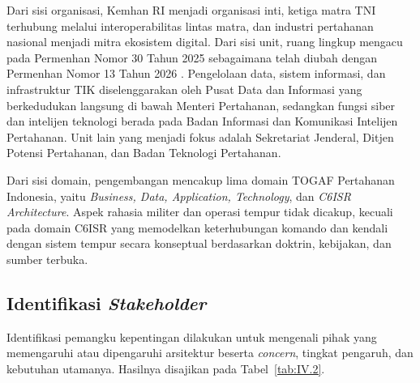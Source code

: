 Dari sisi organisasi, Kemhan RI menjadi organisasi inti, ketiga matra TNI terhubung melalui interoperabilitas lintas matra, dan industri pertahanan nasional menjadi mitra ekosistem digital. Dari sisi unit, ruang lingkup mengacu pada Permenhan Nomor 30 Tahun 2025 \cite{Permenhan30Tahun2025} sebagaimana telah diubah dengan Permenhan Nomor 13 Tahun 2026 \cite{Permenhan13Tahun2026}. Pengelolaan data, sistem informasi, dan infrastruktur TIK diselenggarakan oleh Pusat Data dan Informasi yang berkedudukan langsung di bawah Menteri Pertahanan, sedangkan fungsi siber dan intelijen teknologi berada pada Badan Informasi dan Komunikasi Intelijen Pertahanan. Unit lain yang menjadi fokus adalah Sekretariat Jenderal, Ditjen Potensi Pertahanan, dan Badan Teknologi Pertahanan.

Dari sisi domain, pengembangan mencakup lima domain TOGAF Pertahanan Indonesia, yaitu \textit{Business, Data, Application, Technology}, dan \textit{C6ISR Architecture}. Aspek rahasia militer dan operasi tempur tidak dicakup, kecuali pada domain C6ISR yang memodelkan keterhubungan komando dan kendali dengan sistem tempur secara konseptual berdasarkan doktrin, kebijakan, dan sumber terbuka.

\subsection{Identifikasi \textit{Stakeholder}}
\label{sec:IV.1.3}

Identifikasi pemangku kepentingan dilakukan untuk mengenali pihak yang memengaruhi atau dipengaruhi arsitektur beserta \textit{concern}, tingkat pengaruh, dan kebutuhan utamanya. Hasilnya disajikan pada Tabel~\ref{tab:IV.2}.

